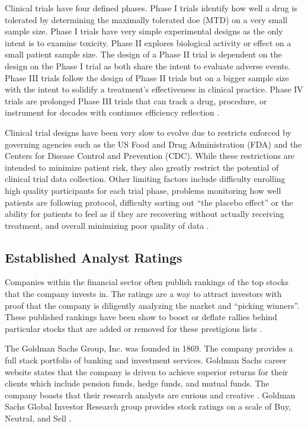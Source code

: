 \documentclass[sigconf]{acmart}
\begin{document}
Clinical trials have four defined phases. Phase I trials identify how well a drug is tolerated by determining the maximally tolerated doe (MTD) on a very small sample size. Phase I trials have very simple experimental designs as the only intent is to examine toxicity. Phase II explores biological activity or effect on a small patient sample size. The design of a Phase II trial is dependent on the design on the Phase I trial as both share the intent to evaluate adverse events. Phase III trials follow the design of Phase II trials but on a bigger sample size with the intent to solidify a treatment's effectiveness in clinical practice. Phase IV trials are prolonged Phase III trials that can track a drug, procedure, or instrument for decades with continues efficiency reflection \cite{Friedman}. 

Clinical trial designs have been very slow to evolve due to restricts enforced by governing agencies such as the US Food and Drug Administration (FDA) and the Centers for Disease Control and Prevention (CDC). While these restrictions are intended to minimize patient risk, they also greatly restrict the potential of clinical trial data collection. Other limiting factors include  difficulty enrolling high quality participants for each trial phase, problems monitoring how well patients are following protocol, difficulty sorting out ``the placebo effect'' or the ability for patients to feel as if they are recovering without actually receiving treatment, and overall minimizing poor quality of data \cite{Friedman}. 

\subsection{Established Analyst Ratings}
Companies within the financial sector often publish rankings of the top stocks that the company invests in. The ratings are a way to attract investors with proof that the company is diligently analyzing the market and ``picking winners''. These published rankings have been show to boost or deflate rallies behind particular stocks that are added or removed for these prestigious lists \cite{www-seekAnalyst}. 

The Goldman Sachs Group, Inc. was founded in 1869. The company provides a full stack portfolio of banking and investment services. Goldman Sachs career website states that the company is driven to achieve superior returns for their clients which include pension funds, hedge funds, and mutual funds. The company boasts that their research analysts are curious and creative \cite{www-gldmanGlance}. Goldman Sachs Global Investor Research group provides stock ratings on a scale of Buy, Neutral, and Sell \cite{www-goldmanTicker}. 
\end{document}

